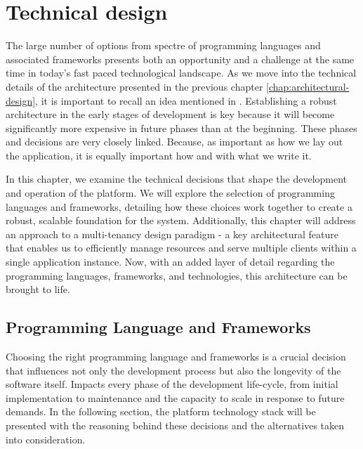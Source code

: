\chapter{Technical design}
\label{chap:technical-design}
The large number of options from spectre of  programming languages and associated frameworks presents both an opportunity and a challenge at the same time in today's fast paced technological landscape.
As we move into the technical details of the architecture presented in the previous chapter \ref{chap:architectural-design}, it is important to recall an idea mentioned in \cite{sommervilleSW}. Establishing a robust architecture in the early stages of development is key because it will become significantly more expensive in future phases than at the beginning. 
These phases and decisions are very closely linked. 
Because, as important as how we lay out the application, it is equally important how and with what we write it.

In this chapter, we examine the technical decisions that shape the development and operation of the platform.
We will explore the selection of programming languages and frameworks, detailing how these choices work together to create a robust, scalable foundation for the system.
Additionally, this chapter will address an approach to a multi-tenancy design paradigm - a key architectural feature that enables us to efficiently manage resources and serve multiple clients within a single application instance.
Now, with an added layer of detail regarding the programming languages, frameworks, and technologies, this architecture can be brought to life. 

\section{Programming Language and Frameworks}
\label{sec:programming-language-frameworks}
Choosing the right programming language and frameworks is a crucial decision that influences not only the development process but also the longevity of the software itself.
Impacts every phase of the development life-cycle, from initial implementation to maintenance and the capacity to scale in response to future demands.
In the following section, the platform technology stack will be presented with the reasoning behind these decisions and the alternatives taken into consideration. 

